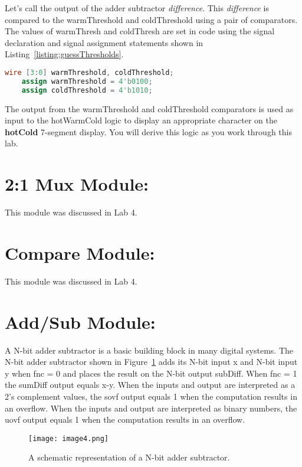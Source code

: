 Let's call the output of the adder subtractor \emph{difference}. This
\emph{difference} is compared to the warmThreshold and coldThreshold
using a pair of comparators. The values of warmThresh and coldThresh are
set in code using the signal declaration and signal assignment
statements shown in Listing~\ref{listing:guessThresholds}.

\begin{lstlisting}[language=Verilog,
 caption={The signal declaration and assignment for guess thresholds.},
 label={listing:guessThresholds},
 frame=single]
    wire [3:0] warmThreshold, coldThreshold; 
    assign warmThreshold = 4'b0100;		
    assign coldThreshold = 4'b1010;
\end{lstlisting}

The output from the warmThreshold and coldThreshold comparators is used
as input to the hotWarmCold logic to display an appropriate character on
the \textbf{hotCold} 7-segment display. You will derive this logic as
you work through this lab.

\hypertarget{mux-module}{%
\section{2:1 Mux Module:}\label{mux-module}}
This module was discussed in Lab 4.


\hypertarget{compare-module}{%
\section{Compare Module:}\label{compare-module}}
This module was discussed in Lab 4.

\hypertarget{addsub-module}{%
\section{Add/Sub Module:}\label{addsub-module}}

A N-bit adder subtractor is a basic building block in many digital
systems. The N-bit adder subtractor shown in Figure~\ref{fig:adderSubSymbol} adds 
its N-bit
input x and N-bit input y when fnc = 0 and places the result on the
N-bit output subDiff. When fnc = 1 the sumDiff output equals x-y. When
the inputs and output are interpreted as a 2's complement values, the
sovf output equals 1 when the computation results in an overflow. When
the inputs and output are interpreted as binary numbers, the uovf output
equals 1 when the computation results in an overflow.

\begin{figure}
\texttt{[image:  image4.png]}
\caption{A schematic representation of a N-bit adder subtractor.}
\label{fig:adderSubSymbol}
\end{figure}

